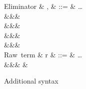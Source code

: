 \begin{figure}
\begin{syntaxfig}
\mbox{Eliminator}
&
\sigma, \tau
&
::=
&
\ldots
\\
&&&
\elimBoolTrue{\kappa}
\\
&&&
\elimBoolFalse{\kappa}
\\
&&&
\elimListSingleton{\branchNil{\kappa}}
\\
&&&
\elimListSingleton{\branchCons{\sigma}}
\\[2mm]
\mbox{Raw term}
&
r
&
::=
&
\ldots
\\
&&&
\exLambda{\sigma}
&
\end{syntaxfig}
\caption{Additional syntax}
\end{figure}
